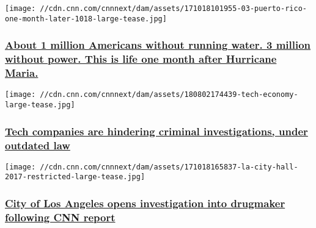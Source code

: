 \texttt{[image: //cdn.cnn.com/cnnnext/dam/assets/171018101955-03-puerto-rico-one-month-later-1018-large-tease.jpg]}

\hypertarget{about-1-million-americans-without-running-water-3-million-without-power-this-is-life-one-month-after-hurricane-maria}{%
\subsubsection{\texorpdfstring{\href{/2017/10/18/health/puerto-rico-one-month-without-water/index.html}{About
1 million Americans without running water. 3 million without power. This
is life one month after Hurricane
Maria.}}{About 1 million Americans without running water. 3 million without power. This is life one month after Hurricane Maria.}}\label{about-1-million-americans-without-running-water-3-million-without-power-this-is-life-one-month-after-hurricane-maria}}

\href{http://money.cnn.com/2017/10/19/technology/criminal-investigations-microsoft-ireland-invs/index.html}{}

\texttt{[image: //cdn.cnn.com/cnnnext/dam/assets/180802174439-tech-economy-large-tease.jpg]}

\hypertarget{tech-companies-are-hindering-criminal-investigations-under-outdated-law}{%
\subsubsection{\texorpdfstring{\href{http://money.cnn.com/2017/10/19/technology/criminal-investigations-microsoft-ireland-invs/index.html}{Tech
companies are hindering criminal investigations, under outdated
law}}{Tech companies are hindering criminal investigations, under outdated law}}\label{tech-companies-are-hindering-criminal-investigations-under-outdated-law}}

\href{/2017/10/19/health/government-investigation-avanir-nuedexta-invs/index.html}{}

\texttt{[image: //cdn.cnn.com/cnnnext/dam/assets/171018165837-la-city-hall-2017-restricted-large-tease.jpg]}

\hypertarget{city-of-los-angeles-opens-investigation-into-drugmaker-following-cnn-report}{%
\subsubsection{\texorpdfstring{\href{/2017/10/19/health/government-investigation-avanir-nuedexta-invs/index.html}{City
of Los Angeles opens investigation into drugmaker following CNN
report}}{City of Los Angeles opens investigation into drugmaker following CNN report}}\label{city-of-los-angeles-opens-investigation-into-drugmaker-following-cnn-report}}

